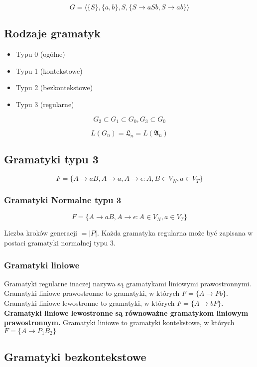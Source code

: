 \documentclass{../notatki}
\begin{document}
$$
G = \langle \{S\}, \{a, b\}, S, \{S \rightarrow aSb, S \rightarrow ab\} \rangle
$$

\subsection{Rodzaje gramatyk}

\begin{itemize}
  \item Typu 0 (ogólne)
  \item Typu 1 (kontekstowe)
  \item Typu 2 (bezkontekstowe)
  \item Typu 3 (regularne)
\end{itemize}

$$
G_2 \subset G_1 \subset G_0, G_3 \subset G_0
$$

$$
L(G_n) = \mathfrak{L}_n = L(\mathfrak{A}_n)
$$

\subsection{Gramatyki typu 3}

$$
F = \{A \rightarrow aB, A \rightarrow a, A \rightarrow \epsilon : A,
B \in V_N, a \in V_T\}
$$

\subsubsection{Gramatyki Normalne typu 3}

$$
F = \{A \rightarrow aB, A \rightarrow \epsilon : A \in V_N, a \in V_T\}
$$

Liczba kroków generacji $= |P|$.
Każda gramatyka regularna może być zapisana w postaci gramatyki
normalnej typu 3.

\subsubsection{Gramatyki liniowe}

Gramatyki regularne inaczej nazywa są gramatykami liniowymi prawostronnymi.
Gramatyki liniowe prawostronne to gramatyki, w których $F = \{A
\rightarrow Pb\}$.
Gramatyki liniowe lewostronne to gramatyki, w których $F = \{A
\rightarrow bP\}$.
\textbf{Gramatyki liniowe lewostronne są równoważne gramatykom
liniowym prawostronnym.}
Gramatyki liniowe to gramatyki kontekstowe, w których $F = \{A
\rightarrow P_1B_2\}$

\subsection{Gramatyki bezkontekstowe}
\end{document}
